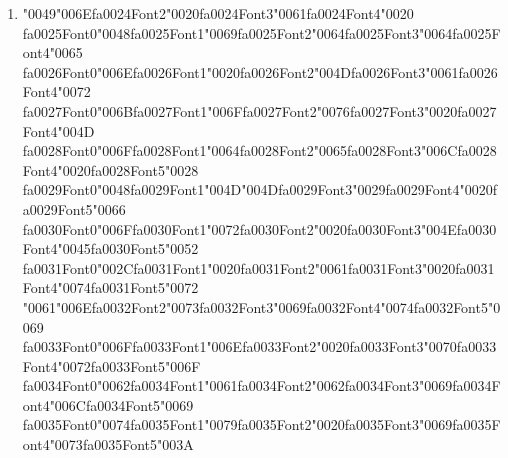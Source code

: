 \documentclass[11pt]{article}
\begin{document}
\begin{enumerate}[label=Q\arabic*., leftmargin=*]
\textbf{A.} It uses only words (observations) and ignores labels

\textbf{B.} It is identical to an HMM

\textbf{C.} It models transitions between labels but does not consider the words

\textbf{D.} It models emissions P(word $\mid$ label)

\item {\char"0049}{\char"006E}{\csname fa0024Font2\endcsname\char"0020}{\csname fa0024Font3\endcsname\char"0061}{\csname fa0024Font4\endcsname\char"0020} {\csname fa0025Font0\endcsname\char"0048}{\csname fa0025Font1\endcsname\char"0069}{\csname fa0025Font2\endcsname\char"0064}{\csname fa0025Font3\endcsname\char"0064}{\csname fa0025Font4\endcsname\char"0065} {\csname fa0026Font0\endcsname\char"006E}{\csname fa0026Font1\endcsname\char"0020}{\csname fa0026Font2\endcsname\char"004D}{\csname fa0026Font3\endcsname\char"0061}{\csname fa0026Font4\endcsname\char"0072} {\csname fa0027Font0\endcsname\char"006B}{\csname fa0027Font1\endcsname\char"006F}{\csname fa0027Font2\endcsname\char"0076}{\csname fa0027Font3\endcsname\char"0020}{\csname fa0027Font4\endcsname\char"004D} {\csname fa0028Font0\endcsname\char"006F}{\csname fa0028Font1\endcsname\char"0064}{\csname fa0028Font2\endcsname\char"0065}{\csname fa0028Font3\endcsname\char"006C}{\csname fa0028Font4\endcsname\char"0020}{\csname fa0028Font5\endcsname\char"0028} {\csname fa0029Font0\endcsname\char"0048}{\csname fa0029Font1\endcsname\char"004D}{\char"004D}{\csname fa0029Font3\endcsname\char"0029}{\csname fa0029Font4\endcsname\char"0020}{\csname fa0029Font5\endcsname\char"0066} {\csname fa0030Font0\endcsname\char"006F}{\csname fa0030Font1\endcsname\char"0072}{\csname fa0030Font2\endcsname\char"0020}{\csname fa0030Font3\endcsname\char"004E}{\csname fa0030Font4\endcsname\char"0045}{\csname fa0030Font5\endcsname\char"0052} {\csname fa0031Font0\endcsname\char"002C}{\csname fa0031Font1\endcsname\char"0020}{\csname fa0031Font2\endcsname\char"0061}{\csname fa0031Font3\endcsname\char"0020}{\csname fa0031Font4\endcsname\char"0074}{\csname fa0031Font5\endcsname\char"0072} {\char"0061}{\char"006E}{\csname fa0032Font2\endcsname\char"0073}{\csname fa0032Font3\endcsname\char"0069}{\csname fa0032Font4\endcsname\char"0074}{\csname fa0032Font5\endcsname\char"0069} {\csname fa0033Font0\endcsname\char"006F}{\csname fa0033Font1\endcsname\char"006E}{\csname fa0033Font2\endcsname\char"0020}{\csname fa0033Font3\endcsname\char"0070}{\csname fa0033Font4\endcsname\char"0072}{\csname fa0033Font5\endcsname\char"006F} {\csname fa0034Font0\endcsname\char"0062}{\csname fa0034Font1\endcsname\char"0061}{\csname fa0034Font2\endcsname\char"0062}{\csname fa0034Font3\endcsname\char"0069}{\csname fa0034Font4\endcsname\char"006C}{\csname fa0034Font5\endcsname\char"0069} {\csname fa0035Font0\endcsname\char"0074}{\csname fa0035Font1\endcsname\char"0079}{\csname fa0035Font2\endcsname\char"0020}{\csname fa0035Font3\endcsname\char"0069}{\csname fa0035Font4\endcsname\char"0073}{\csname fa0035Font5\endcsname\char"003A}


\end{enumerate}
\end{document}
